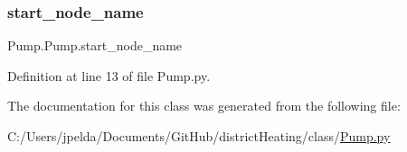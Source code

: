 \subsubsection{\texorpdfstring{start\+\_\+node\+\_\+name}{start\_node\_name}}
{\footnotesize\ttfamily Pump.\+Pump.\+start\+\_\+node\+\_\+name}



Definition at line 13 of file Pump.\+py.



The documentation for this class was generated from the following file\+:\begin{DoxyCompactItemize}
\item 
C\+:/\+Users/jpelda/\+Documents/\+Git\+Hub/district\+Heating/class/\hyperlink{_pump_8py}{Pump.\+py}\end{DoxyCompactItemize}
